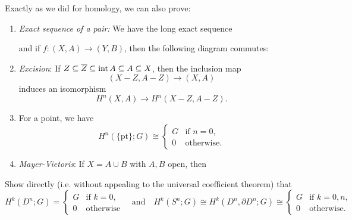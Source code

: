 \begin{remark}
  Exactly as we did for homology, we can also prove:
  \begin{enumerate}
    \item \emph{Exact sequence of a pair:}
      We have the long exact sequence
      \begin{center}
      \end{center}
      and if $f : (X, A) \to (Y, B)$, then
      the following diagram commutes:
      \begin{center}
      \end{center}
    \item \emph{Excision}: If
      $Z \subseteq \overline{Z} \subseteq \operatorname{int} A \subseteq A \subseteq X$, then
      the inclusion map
      \[
        (X - Z, A - Z) \longrightarrow (X, A)
      \]
      induces an isomorphism
      \[
        H^n(X, A) \longrightarrow H^n(X - Z, A - Z).
      \]
    \item For a point, we have
      \[
        H^n(\{\mathrm{pt}\}; G)
        \cong
        \begin{cases}
          G & \text{if } n = 0, \\
          0 & \text{otherwise}.
        \end{cases}
      \]
    \item \emph{Mayer-Vietoris}: If
      $X = A \cup B$ with $A, B$ open, then
      \begin{center}
      \end{center}
  \end{enumerate}
\end{remark}

\begin{exercise}
  Show directly (i.e. without appealing to the
  universal coefficient theorem) that
  \[
    H^k(D^n; G) =
    \begin{cases}
      G & \text{if } k = 0, \\
      0 & \text{otherwise}
    \end{cases}
    \quad \text{and} \quad
    H^k(S^n; G)
    \cong H^k(D^n, \partial D^n; G)
    \cong
    \begin{cases}
      G & \text{if } k = 0, n, \\
      0 & \text{otherwise}.
    \end{cases}
  \]
\end{exercise}

